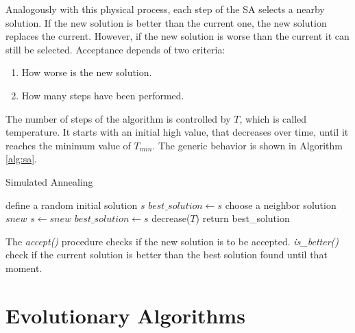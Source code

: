 			Analogously with this physical process, each step of the SA selects a nearby solution. If the new solution is better than the current one, the new solution replaces the current. However, if the new solution is worse than the current it can still be selected. Acceptance depends of two criteria:
			\begin{enumerate}
				\item How worse is the new solution.
				\item How many steps have been performed.
			\end{enumerate}
			The number of steps of the algorithm is controlled by $T$, which is called temperature. It starts with an initial high value, that decreases over time, until it reaches the minimum value of $T_{min}$. The generic behavior is shown in Algorithm \ref{alg:sa}.
			
			
			\begin{algorithm}
				\caption{Simulated Annealing}
				\label{alg:sa}
				\begin{algorithmic}
				\STATE define a random initial solution $s$
				\STATE $best\_solution \gets s$ 
					\STATE choose a neighbor solution $snew$
						\STATE  $s \gets snew$
					\ENDIF
						\STATE  $best\_solution \gets s$
					\ENDIF
					\STATE decrease($T$)
				\ENDWHILE
				\STATE return best\_solution
				\end{algorithmic}
			\end{algorithm}
		
		
		\noindent The \emph{accept()} procedure checks if the new solution is to be accepted. \emph{is\_better()} check if the current solution is better than the best solution found until that moment.

			
		\section{Evolutionary Algorithms}
			\label{subsec:evolutionary_algorithms}
			
